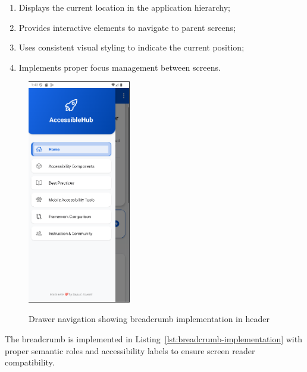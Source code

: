 \begin{enumerate}
    \item Displays the current location in the application hierarchy;
    \item Provides interactive elements to navigate to parent screens;
    \item Uses consistent visual styling to indicate the current position;
    \item Implements proper focus management between screens.
\end{enumerate}

\begin{figure}[ht]
    \centering
    \includegraphics[width=0.4\textwidth, alt={Drawer navigation with breadcrumb in header}]{img/drawer.png}
    \caption{Drawer navigation showing breadcrumb implementation in header}\label{fig:drawer-navigation}
\end{figure}

\FloatBarrier

The breadcrumb is implemented in Listing~\ref{lst:breadcrumb-implementation} with proper semantic roles and accessibility labels to ensure screen reader compatibility.

